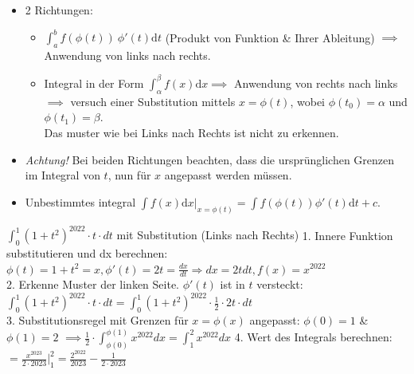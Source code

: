 \documentclass[a4paper]{article}
\begin{document}
\begin{itemize}[leftmargin=4.5mm, topsep=1pt, parsep=1pt]
    \item 2 Richtungen: 
      \begin{itemize}[leftmargin=4.5mm, topsep=1pt, parsep=1pt]
        \item $\int_{a}^{b} f(\phi(t)) \ \phi'(t)\mathrm{d}t$ (Produkt von Funktion \& Ihrer Ableitung)  $\implies$ Anwendung von links nach rechts.
        \item Integral in der Form $\int_{\alpha}^{\beta} f(x) \mathrm{d}x \implies$ Anwendung von rechts nach links $\implies$ versuch einer Substitution mittels $x = \phi(t)$, wobei $\phi(t_0) = \alpha$ und $\phi(t_1) = \beta$. \\
             \tiny \color{gray}
                Das muster wie bei Links nach Rechts ist nicht zu erkennen. 
            \normalsize \color{black}
      \end{itemize}
    \item \textit{Achtung!} Bei beiden Richtungen beachten, dass die ursprünglichen Grenzen im Integral von $t$, nun für $x$ angepasst werden müssen.
    \item Unbestimmtes integral $\int f(x) \mathrm{d}x |_{x=\phi(t)} = \int f(\phi(t))\phi'(t) \mathrm{d}t + c$.
\end{itemize}

\begin{bspbox}{$\int_0^1(1+t^2)^{2022} \cdot t \cdot dt$ mit Substitution (Links nach Rechts)}
  1. Innere Funktion substitutieren und dx berechnen: \\
  $\phi(t) = 1+t^2 = x, \phi'(t) = 2t = \frac{dx}{dt} \Rightarrow dx = 2tdt, f(x) = x^{2022}$ \\
  2. Erkenne Muster der linken Seite. $\phi'(t)$ ist in $t$ versteckt: \\
  $\int_0^1(1+t^2)^{2022} \cdot t \cdot dt = \int_0^1(1+t^2)^{2022} \cdot \frac{1}{2} \cdot 2t \cdot dt$ \\
  3. Substitutionsregel mit Grenzen für $x = \phi(x)$ angepasst: $\phi(0) = 1$ \& $\phi(1) = 2$
  $\implies \frac{1}{2} \cdot \int_{\phi(0)}^{\phi(1)} x^{2022}dx =  \int_{1}^{2} x^{2022}dx$
  4. Wert des Integrals berechnen: $= \frac{x^{2023}}{2 \cdot 2023} |_{1}^{2} = \frac{2^{2022}}{2023} - \frac{1}{2 \cdot 2023}$ \\
\end{bspbox}
\end{document}
